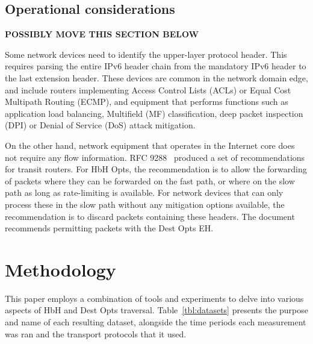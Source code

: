 \documentclass[conference]{IEEEtran}
\begin{document}
\subsection{Operational considerations}

\textbf{POSSIBLY MOVE THIS SECTION BELOW}

Some network devices need to identify the upper-layer protocol header. This
requires parsing the entire IPv6 header chain from the mandatory IPv6 header to
the last extension header. These devices are common in the network domain edge,
and include routers implementing Access Control Lists (ACLs) or Equal Cost
Multipath Routing (ECMP), and equipment that performs functions such as
application load balancing, Multifield (MF) classification, deep packet
inspection (DPI) or Denial of Service (DoS) attack mitigation.

On the other hand, network equipment that operates in the Internet core does
not require any flow information. RFC 9288~\cite{rfc9288} produced a set of
recommendations for transit routers. For HbH Opts, the recommendation is to
allow the forwarding of packets where they can be forwarded on the fast path,
or where on the slow path as long as rate-limiting is available. For network
devices that can only process these in the slow path without any mitigation
options available, the recommendation is to discard packets containing these
headers. The document recommends permitting packets with the Dest Opts EH.



\section{Methodology} 
\label{sec:methodology}

This paper employs a combination of tools and experiments to delve into various aspects of HbH and Dest Opts traversal. Table~\ref{tbl:datasets} presents the purpose and name of each resulting dataset, alongside the time periods each measurement was ran and the transport protocols that it used.
\end{document}
